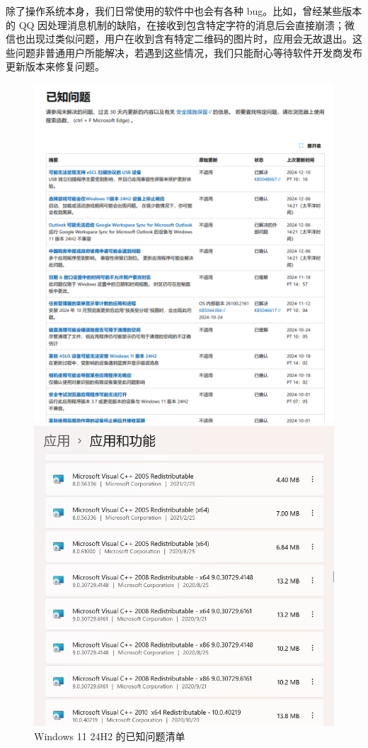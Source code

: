 除了操作系统本身，我们日常使用的软件中也会有各种 bug。比如，曾经某些版本的 QQ 因处理消息机制的缺陷，在接收到包含特定字符的消息后会直接崩溃；微信也出现过类似问题，用户在收到含有特定二维码的图片时，应用会无故退出。这些问题非普通用户所能解决，若遇到这些情况，我们只能耐心等待软件开发商发布更新版本来修复问题。

\begin{figure}[htb!]
  \centering
  \begin{minipage}{.49\textwidth}
    \centering
    \includegraphics[width=.95\textwidth]{assets/basic/Windows_bugs.png}
    \caption{Windows 11 24H2 的已知问题清单}
    \label{fig:Windows_bugs}
  \end{minipage}
    \begin{minipage}{.49\textwidth}
      \centering
      \includegraphics[width=.95\textwidth]{assets/basic/MS_CPP_redises.png}

\end{minipage}
\end{figure}
